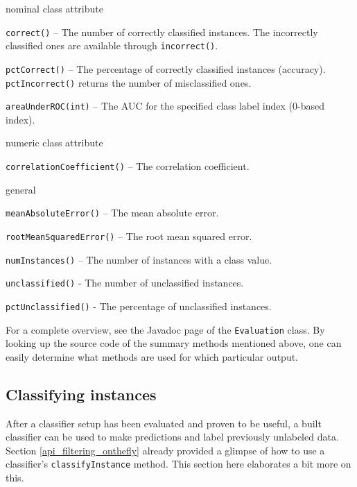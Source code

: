 \begin{tight_itemize}
	\item nominal class attribute
	\begin{tight_itemize}
		\item \texttt{correct()} -- The number of correctly classified
instances. The incorrectly classified ones are available through
\texttt{incorrect()}.
		\item \texttt{pctCorrect()} -- The percentage of correctly classified
instances (accuracy). \texttt{pctIncorrect()} returns the number of
misclassified ones.
		\item \texttt{areaUnderROC(int)} -- The AUC for the specified class
label index (0-based index).
	\end{tight_itemize}

	\item numeric class attribute
	\begin{tight_itemize}
		\item \texttt{correlationCoefficient()} -- The correlation coefficient.
	\end{tight_itemize}

	\item general
	\begin{tight_itemize}
		\item \texttt{meanAbsoluteError()} -- The mean absolute error.
		\item \texttt{rootMeanSquaredError()} -- The root mean squared error.
		\item \texttt{numInstances()} -- The number of instances with a class
value.
		\item \texttt{unclassified()} - The number of unclassified instances.
		\item \texttt{pctUnclassified()} - The percentage of unclassified
instances.
	\end{tight_itemize}
\end{tight_itemize}
For a complete overview, see the Javadoc page of the \texttt{Evaluation} class.
By looking up the source code of the summary methods mentioned above, one can
easily determine what methods are used for which particular output.

\newpage

\subsection{Classifying instances}
After a classifier setup has been evaluated and proven to be useful, a built
classifier can be used to make predictions and label previously unlabeled data.
Section \ref{api_filtering_onthefly} already provided a glimpse of how to use a
classifier's \texttt{classifyInstance} method. This section here elaborates a
bit more on this.

